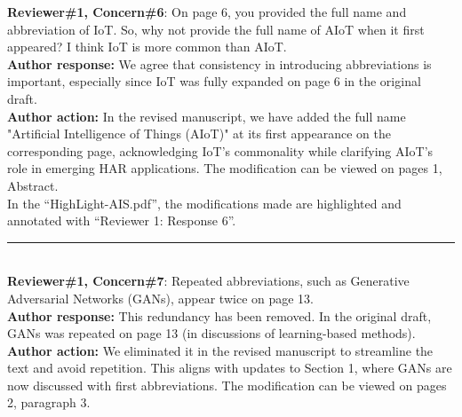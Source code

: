 \documentclass[Afour,sageh,times]{sagej}
\begin{document}
\textcolor{myGreen}{ \textbf{Reviewer\#1, Concern\#6}: On page 6, you provided the full name and abbreviation of IoT. So, why not provide the full name of AIoT when it first appeared? I think IoT is more common than AIoT.}  \\

\textbf{Author response:} We agree that consistency in introducing abbreviations is important, especially since IoT was fully expanded on page 6 in the original draft.\\
\textbf{Author action:} In the revised manuscript, we have added the full name "Artificial Intelligence of Things (AIoT)" at its first appearance on the corresponding page, acknowledging IoT's commonality while clarifying AIoT's role in emerging HAR applications. The modification can be viewed on pages 1, Abstract.\\

\textcolor{myOrange}{
In the “HighLight-AIS.pdf”, the modifications made are highlighted and annotated with “Reviewer 1: Response 6”. }\\%

\color{gray}\rule{\linewidth}{1pt}\normalcolor\\

\textcolor{myGreen}{ \textbf{Reviewer\#1, Concern\#7}: Repeated abbreviations, such as Generative Adversarial Networks (GANs), appear twice on page 13.}  \\

\textbf{Author response:} This redundancy has been removed. In the original draft, GANs was repeated on page 13 (in discussions of learning-based methods).\\
\textbf{Author action:} We eliminated it in the revised manuscript to streamline the text and avoid repetition. This aligns with updates to Section 1, where GANs are now discussed with first abbreviations. The modification can be viewed on pages 2, paragraph 3.\\
\end{document}
